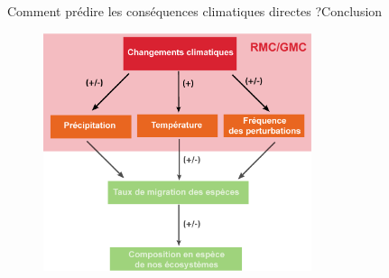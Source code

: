 \documentclass{eecslides}
\begin{document}

	\begin{frame}[t]{Comment prédire les conséquences climatiques directes ?}{Conclusion}

		\begin{figure}
			\vspace{-0.5cm}
			\includegraphics[width=0.7\textwidth]{CCscheme3.png} 
		\end{figure}    
	
	\end{frame}
\end{document}
